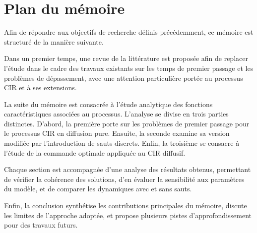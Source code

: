 \section{Plan du mémoire}  %
Afin de répondre aux objectifs de recherche définis précédemment, ce mémoire est structuré de la manière suivante.

Dans un premier temps, une revue de la littérature est proposée afin de replacer l'étude dans le cadre des travaux existants sur les temps de premier passage et les problèmes de dépassement, avec une attention particulière portée au processus \acs{CIR} et à ses extensions.

La suite du mémoire est consacrée à l'étude analytique des fonctions caractéristiques associées au processus. L'analyse se divise en trois parties distinctes. D'abord, la première porte sur les problèmes de premier passage pour le processus \acs{CIR} en diffusion pure. Ensuite, la seconde examine sa version modifiée par l'introduction de sauts discrets. Enfin, la troisième se consacre à l'étude de la commande optimale appliquée au \acs{CIR} diffusif.

Chaque section est accompagnée d'une analyse des résultats obtenus, permettant de vérifier la cohérence des solutions, d'en évaluer la sensibilité aux paramètres du modèle, et de comparer les dynamiques avec et sans sauts.

Enfin, la conclusion synthétise les contributions principales du mémoire, discute les limites de l'approche adoptée, et propose plusieurs pistes d'approfondissement pour des travaux futurs.

